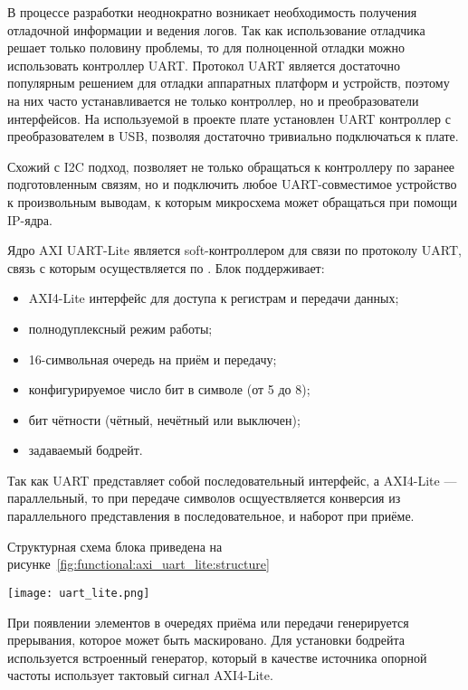 В процессе разработки неоднократно возникает необходимость получения отладочной
информации и ведения логов. Так как использование отладчика решает только половину
проблемы, то для полноценной отладки можно использовать контроллер UART. Протокол
UART является достаточно популярным решением для отладки аппаратных платформ и устройств,
поэтому на них часто устанавливается не только контроллер, но и преобразователи
интерфейсов. На используемой в проекте плате установлен UART контроллер с преобразователем
в USB, позволяя достаточно тривиально подключаться к плате.

Схожий с I2C подход, позволяет не только обращаться к контроллеру по заранее подготовленным связям, но и
подключить любое UART-совместимое устройство к произвольным выводам, к которым микросхема может обращаться
при помощи IP-ядра.

Ядро AXI UART-Lite является soft-контроллером для связи по протоколу UART, связь с которым осуществляется
по . Блок поддерживает:
\begin{itemize}
  \item AXI4-Lite интерфейс для доступа к регистрам и передачи данных;
  \item полнодуплексный режим работы;
  \item 16-символьная очередь на приём и передачу;
  \item конфигурируемое число бит в символе (от 5 до 8);
  \item бит чётности (чётный, нечётный или выключен);
  \item задаваемый бодрейт.
\end{itemize}

Так как UART представляет собой последовательный интерфейс, а AXI4-Lite --- параллельный,
то при передаче символов осщуествляется конверсия из параллельного представления в
последовательное, и наборот при приёме.

Структурная схема блока приведена на рисунке~\ref{fig:functional:axi_uart_lite:structure}

\begin{center}
  \centering
  \texttt{[image: uart\_lite.png]}
  \label{fig:functional:axi_uart_lite:structure}
\end{center}

При появлении элементов в очередях приёма или передачи генерируется прерывания,
которое может быть маскировано. Для установки бодрейта используется встроенный генератор,
который в качестве источника опорной частоты использует тактовый сигнал AXI4-Lite.

